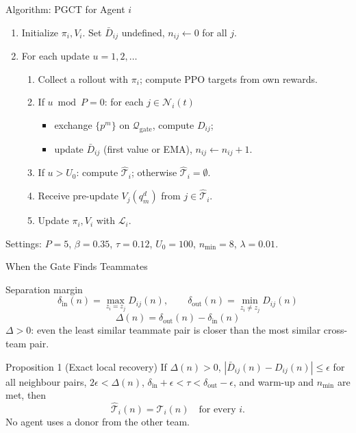 \documentclass{beamer}
\begin{document}
\begin{frame}{Algorithm: PGCT for Agent $i$}
  \small
  \begin{block}{}
    \begin{enumerate}
      \item Initialize $\pi_i, V_i$. Set $\bar D_{ij}$ undefined, $n_{ij} \leftarrow 0$ for all $j$.
      \item For each update $u = 1, 2, \dots$
      \begin{enumerate}
        \item Collect a rollout with $\pi_i$; compute PPO targets from own rewards.
        \item If $u \bmod P = 0$: for each $j \in \mathcal{N}_i(t)$
        \begin{itemize}
          \item exchange $\{p^m\}$ on $\mathcal{Q}_{\mathrm{gate}}$, compute $D_{ij}$;
          \item update $\bar D_{ij}$ (first value or EMA), $n_{ij} \leftarrow n_{ij} + 1$.
        \end{itemize}
        \item If $u > U_0$: compute $\hat{\mathcal{T}}_i$; otherwise $\hat{\mathcal{T}}_i = \emptyset$.
        \item Receive pre-update $V_j(q^d_m)$ from $j \in \hat{\mathcal{T}}_i$.
        \item Update $\pi_i, V_i$ with $\mathcal{L}_i$.
      \end{enumerate}
    \end{enumerate}
  \end{block}
  Settings: $P=5$, $\beta=0.35$, $\tau=0.12$, $U_0=100$, $n_{\min}=8$, $\lambda=0.01$.
\end{frame}

\begin{frame}{When the Gate Finds Teammates}
  \small
  \begin{block}{Separation margin}
    \[
      \delta_{\mathrm{in}}(n) = \max_{z_i = z_j} D_{ij}(n), \qquad
      \delta_{\mathrm{out}}(n) = \min_{z_i \neq z_j} D_{ij}(n)
    \]
    \[
      \Delta(n) = \delta_{\mathrm{out}}(n) - \delta_{\mathrm{in}}(n)
    \]
    $\Delta > 0$: even the least similar teammate pair is closer than the most similar cross-team pair.
  \end{block}

  \begin{block}{Proposition 1 (Exact local recovery)}
    If $\Delta(n) > 0$, $|\bar D_{ij}(n) - D_{ij}(n)| \le \epsilon$ for all neighbour pairs, $2\epsilon < \Delta(n)$,
    $\delta_{\mathrm{in}} + \epsilon < \tau < \delta_{\mathrm{out}} - \epsilon$, and warm-up and $n_{\min}$ are met, then
    \[
      \hat{\mathcal{T}}_i(n) = \mathcal{T}_i(n) \quad \text{for every } i.
    \]
    No agent uses a donor from the other team.
  \end{block}
\end{frame}
\end{document}
